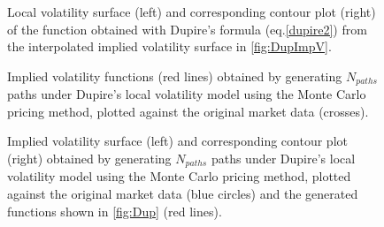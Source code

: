 \begin{figure}[H]
  \begin{subfigmatrix}{2}
  \end{subfigmatrix}
    \caption[Local volatility surface and corresponding contour plot of the function obtained with Dupire's formula from the interpolated implied volatility surface.]{Local volatility surface (left) and corresponding contour plot (right) of the function obtained with Dupire's formula (eq.\eqref{dupire2}) from the interpolated implied volatility surface in \autoref{fig:DupImpV}.}\label{fig:DupLocVol}
\end{figure}   


\begin{figure}[H]
  \begin{subfigmatrix}{2}
  \end{subfigmatrix}
  \caption[Implied volatility functions obtained by generating $N_{paths}$ paths under Dupire's local volatility model using the Monte Carlo pricing method, plotted against the original market data.]{Implied volatility functions (red lines) obtained by generating $N_{paths}$ paths under Dupire's local volatility model using the Monte Carlo pricing method, plotted against the original market data (crosses).}
  \label{fig:Dup}
\end{figure}


\begin{figure}[H]
  \begin{subfigmatrix}{2}
  \end{subfigmatrix}
    \caption[Implied volatility surface and corresponding contour plot obtained by generating $N_{paths}$ paths under Dupire's local volatility model using the Monte Carlo pricing method plotted against the original market data and the generated functions shown in \autoref{fig:Dup}.]{Implied volatility surface (left) and corresponding contour plot (right) obtained by generating $N_{paths}$ paths under Dupire's local volatility model using the Monte Carlo pricing method, plotted against the original market data (blue circles) and the generated functions shown in \autoref{fig:Dup} (red lines).}\label{fig:DupS}
\end{figure}   

